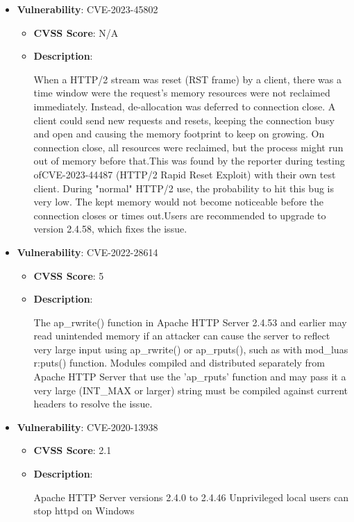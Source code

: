 \documentclass{article}
\begin{document}
\begin{itemize}
        \item \textbf{Vulnerability}: CVE-2023-45802
        \begin{itemize}
            \item \textbf{CVSS Score}:  N/A 
            \item \textbf{Description}:
            \parbox[t]{0.9\linewidth}{
                \ttfamily When a HTTP/2 stream was reset (RST frame) by a client, there was a time window were the request's memory resources were not reclaimed immediately. Instead, de-allocation was deferred to connection close. A client could send new requests and resets, keeping the connection busy and open and causing the memory footprint to keep on growing. On connection close, all resources were reclaimed, but the process might run out of memory before that.This was found by the reporter during testing ofCVE-2023-44487 (HTTP/2 Rapid Reset Exploit) with their own test client. During "normal" HTTP/2 use, the probability to hit this bug is very low. The kept memory would not become noticeable before the connection closes or times out.Users are recommended to upgrade to version 2.4.58, which fixes the issue.
            }
        \end{itemize}
    
        \item \textbf{Vulnerability}: CVE-2022-28614
        \begin{itemize}
            \item \textbf{CVSS Score}:  5 
            \item \textbf{Description}:
            \parbox[t]{0.9\linewidth}{
                \ttfamily The ap\_rwrite() function in Apache HTTP Server 2.4.53 and earlier may read unintended memory if an attacker can cause the server to reflect very large input using ap\_rwrite() or ap\_rputs(), such as with mod\_luas r:puts() function. Modules compiled and distributed separately from Apache HTTP Server that use the 'ap\_rputs' function and may pass it a very large (INT\_MAX or larger) string must be compiled against current headers to resolve the issue.
            }
        \end{itemize}
    
        \item \textbf{Vulnerability}: CVE-2020-13938
        \begin{itemize}
            \item \textbf{CVSS Score}:  2.1 
            \item \textbf{Description}:
            \parbox[t]{0.9\linewidth}{
                \ttfamily Apache HTTP Server versions 2.4.0 to 2.4.46 Unprivileged local users can stop httpd on Windows
            }
        \end{itemize}
    

\end{itemize}
\end{document}
